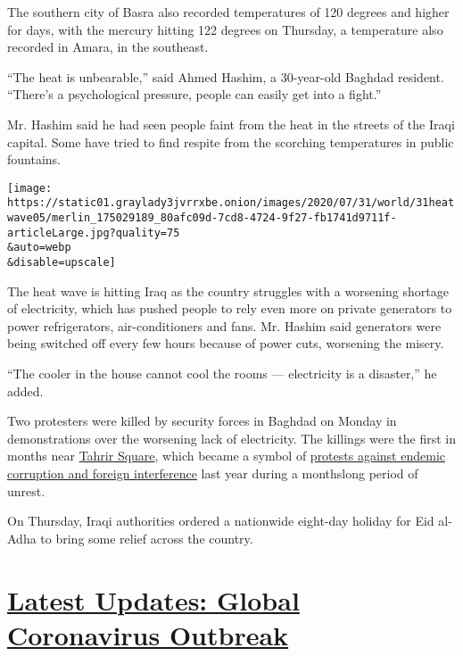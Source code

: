 The southern city of Basra also recorded temperatures of 120 degrees and
higher for days, with the mercury hitting 122 degrees on Thursday, a
temperature also recorded in Amara, in the southeast.

``The heat is unbearable,'' said Ahmed Hashim, a 30-year-old Baghdad
resident. ``There's a psychological pressure, people can easily get into
a fight.''

Mr. Hashim said he had seen people faint from the heat in the streets of
the Iraqi capital. Some have tried to find respite from the scorching
temperatures in public fountains.

\texttt{[image: https://static01.graylady3jvrrxbe.onion/images/2020/07/31/world/31heatwave05/merlin\_175029189\_80afc09d-7cd8-4724-9f27-fb1741d9711f-articleLarge.jpg?quality=75\\\&auto=webp\\\&disable=upscale]}

The heat wave is hitting Iraq as the country struggles with a worsening
shortage of electricity, which has pushed people to rely even more on
private generators to power refrigerators, air-conditioners and fans.
Mr. Hashim said generators were being switched off every few hours
because of power cuts, worsening the misery.

``The cooler in the house cannot cool the rooms --- electricity is a
disaster,'' he added.

Two protesters were killed by security forces in Baghdad on Monday in
demonstrations over the worsening lack of electricity. The killings were
the first in months near
\href{https://www.nytimes3xbfgragh.onion/2019/11/20/world/middleeast/iraq-protests-sadr-city.html}{Tahrir
Square}, which became a symbol of
\href{https://www.nytimes3xbfgragh.onion/2019/12/21/world/middleeast/Iraq-protests-Iran.html}{protests
against endemic corruption and foreign interference} last year during a
monthslong period of unrest.

On Thursday, Iraqi authorities ordered a nationwide eight-day holiday
for Eid al-Adha to bring some relief across the country.

\hypertarget{latest-updates-global-coronavirus-outbreak}{%
\section{\texorpdfstring{\href{https://www.nytimes3xbfgragh.onion/2020/08/04/world/coronavirus-cases.html?action=click\&pgtype=Article\&state=default\&region=MAIN_CONTENT_1\&context=storylines_live_updates}{Latest
Updates: Global Coronavirus
Outbreak}}{Latest Updates: Global Coronavirus Outbreak}}\label{latest-updates-global-coronavirus-outbreak}}


